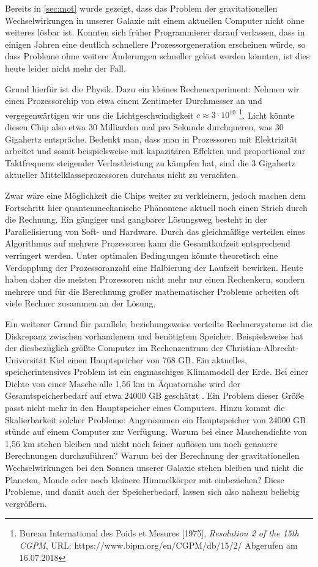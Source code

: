 Bereits in \autoref{sec:mot} wurde gezeigt, dass das Problem der gravitationellen Wechselwirkungen in unserer Galaxie mit einem aktuellen Computer nicht ohne 
    weiteres lösbar ist. 
    Konnten sich früher Programmierer darauf verlassen, dass in einigen Jahren eine deutlich schnellere Prozessorgeneration erscheinen würde, so dass Probleme ohne 
    weitere Änderungen schneller gelöst werden könnten, ist dies heute leider nicht mehr der Fall. 
    
    Grund hierfür ist die Physik. Dazu ein kleines Rechenexperiment: Nehmen wir einen Prozessorchip von etwa einem Zentimeter Durchmesser an und vergegenwärtigen wir 
    uns die Lichtgeschwindigkeit $c \approx 3\cdot10^{10}$ \footnote{Bureau International des Poids et Mesures [1975], \textit{Resolution 2 of the 15th CGPM}, URL:
    https://www.bipm.org/en/CGPM/db/15/2/ Abgerufen am 16.07.2018}. Licht könnte diesen Chip also etwa 30 Milliarden mal pro Sekunde durchqueren, was 30 Gigahertz
    entspräche. Bedenkt man, dass man in Prozessoren mit Elektrizität arbeitet und somit beispielsweise mit kapazitären Effekten und proportional zur Taktfrequenz steigender
    Verlustleistung zu kämpfen hat, sind die 3 Gigahertz aktueller Mittelklasseprozessoren durchaus nicht zu verachten.
    
    Zwar wäre eine Möglichkeit die Chips weiter zu verkleinern, jedoch machen dem Fortschritt hier quantenmechanische Phänomene aktuell noch einen Strich durch die Rechnung.
    Ein gängiger und gangbarer Lösungsweg besteht in der Parallelisierung von Soft- und Hardware. Durch das gleichmäßige verteilen eines Algorithmus auf mehrere Prozessoren
    kann die Gesamtlaufzeit entsprechend verringert werden. Unter optimalen Bedingungen könnte theoretisch eine Verdopplung der Prozessoranzahl eine Halbierung der Laufzeit
    bewirken. Heute haben daher die meisten Prozessoren nicht mehr nur einen Rechenkern, sondern mehrere und für die Berechnung großer mathematischer Probleme arbeiten oft viele
    Rechner zusammen an der Lösung. \citep{hpcskript}
    
    Ein weiterer Grund für parallele, beziehungsweise verteilte Rechnersysteme ist die Diskrepanz zwischen vorhandenem und benötigtem Speicher. Beispielsweise hat der diesbezüglich größte
    Computer im Rechenzentrum der Christian-Albrecht-Universität Kiel einen Hauptspeicher von 768 GB. Ein aktuelles, speicherintensives Problem ist ein engmaschiges 
    Klimamodell der Erde. Bei einer Dichte von einer Masche alle 1,56 km in Äquatornähe wird der Gesamtspeicherbedarf auf etwa 24000 GB geschätzt \citep{climate}. Ein Problem
    dieser Größe passt nicht mehr in den Hauptspeicher eines Computers.
    Hinzu kommt die Skalierbarkeit solcher Probleme: Angenommen ein Hauptspeicher von 24000 GB stünde auf einem Computer zur Verfügung. Warum bei einer Maschendichte von 
    1,56 km stehen bleiben und nicht noch feiner auflösen um noch genauere Berechnungen durchzuführen?
    Warum bei der Berechnung der gravitationellen Wechselwirkungen bei den Sonnen unserer Galaxie stehen bleiben und nicht die Planeten, Monde oder noch kleinere Himmelkörper mit einbeziehen? 
    Diese Probleme, und damit auch der Speicherbedarf, lassen sich also nahezu beliebig vergrößern.
    

